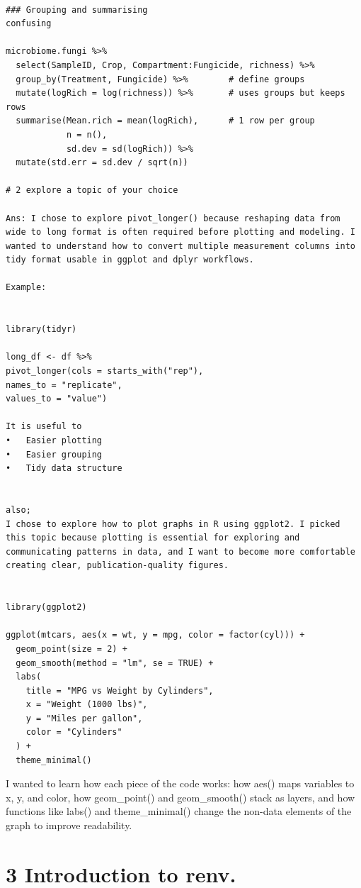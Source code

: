 \documentclass[
]{article}
\begin{document}
\begin{verbatim}

### Grouping and summarising
confusing

microbiome.fungi %>%
  select(SampleID, Crop, Compartment:Fungicide, richness) %>%
  group_by(Treatment, Fungicide) %>%        # define groups
  mutate(logRich = log(richness)) %>%       # uses groups but keeps rows
  summarise(Mean.rich = mean(logRich),      # 1 row per group
            n = n(),
            sd.dev = sd(logRich)) %>%
  mutate(std.err = sd.dev / sqrt(n))

# 2 explore a topic of your choice

Ans: I chose to explore pivot_longer() because reshaping data from wide to long format is often required before plotting and modeling. I wanted to understand how to convert multiple measurement columns into tidy format usable in ggplot and dplyr workflows. 

Example: 


library(tidyr)

long_df <- df %>%
pivot_longer(cols = starts_with("rep"),
names_to = "replicate",
values_to = "value")

It is useful to
•   Easier plotting
•   Easier grouping
•   Tidy data structure


also;
I chose to explore how to plot graphs in R using ggplot2. I picked this topic because plotting is essential for exploring and communicating patterns in data, and I want to become more comfortable creating clear, publication-quality figures. 


library(ggplot2)

ggplot(mtcars, aes(x = wt, y = mpg, color = factor(cyl))) + 
  geom_point(size = 2) +
  geom_smooth(method = "lm", se = TRUE) +
  labs(
    title = "MPG vs Weight by Cylinders",
    x = "Weight (1000 lbs)",
    y = "Miles per gallon",
    color = "Cylinders"
  ) +
  theme_minimal()
\end{verbatim}

I wanted to learn how each piece of the code works: how aes() maps
variables to x, y, and color, how geom\_point() and geom\_smooth() stack
as layers, and how functions like labs() and theme\_minimal() change the
non-data elements of the graph to improve readability.

\section{3 Introduction to renv.}\label{introduction-to-renv.}
\end{document}
